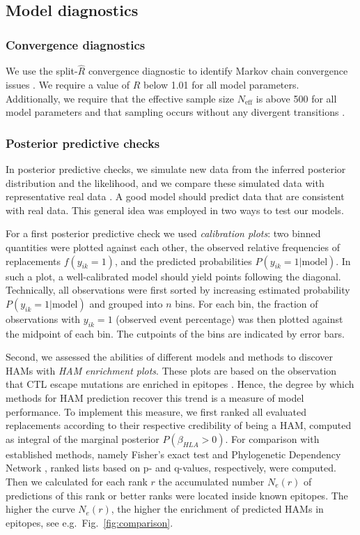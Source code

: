 \documentclass{bioinfo}
\begin{document}
\begin{methods}
\subsection{Model diagnostics}

\subsubsection{Convergence diagnostics}
We use the split-\(\hat{R}\) convergence diagnostic to identify Markov chain convergence issues \citep{Gelman1992, Stan2021}. We require a value of \(\hat{R}\) below 1.01 for all model parameters. Additionally, we require that the effective sample size \(N_{\text{eff}}\) is above 500 for all model parameters and that sampling occurs without any divergent transitions \citep{Stan2021}.

\subsubsection{Posterior predictive checks}

In posterior predictive checks, we simulate new data from the inferred posterior distribution and the likelihood, and we compare these simulated data with representative real data \citep{Gabry2019}. A good model should predict data that are consistent with real data. This general idea was employed in two ways to test our models.

For a first posterior predictive check we used \emph{calibration plots}: two binned quantities were plotted against each other, the observed relative frequencies of replacements $f(y_{ik}=1)$, and the predicted probabilities $P(y_{ik}=1|\text{model})$. In such a plot, a well-calibrated model should yield points following the diagonal. Technically, all observations were first sorted by increasing estimated probability $P(y_{ik}=1|\text{model})$ and grouped into $n$ bins. For each bin, the fraction of observations with $y_{ik}=1$ (observed event percentage) was then plotted against the midpoint of each bin. The cutpoints of the bins are indicated by error bars.

Second, we assessed the abilities of different models and methods to discover HAMs with \emph{HAM enrichment plots}. These plots are based on the observation that CTL escape mutations are enriched in epitopes \citep{Bronke2013}. Hence, the degree by which methods for HAM prediction recover this trend is a measure of model performance. To implement this measure, we first ranked all evaluated replacements according to their respective credibility of being a HAM, computed as integral of the marginal posterior $P(\beta_{HLA}>0)$. For comparison with established methods, namely Fisher's exact test and Phylogenetic Dependency Network \citep{Carlson2008}, ranked lists based on p- and q-values, respectively, were computed. Then we calculated for each rank $r$ the accumulated number $N_e(r)$ of predictions of this rank or better ranks were located inside known epitopes. The higher the curve $N_e(r)$, the higher the enrichment of predicted HAMs in epitopes, see e.g.\ Fig.\ \ref{fig:comparison}.


\end{methods}
\end{document}
